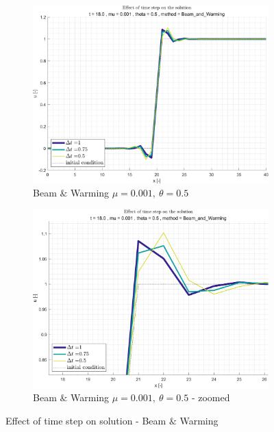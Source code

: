 \documentclass[11pt, a4paper]{article}
\begin{document}
\begin{figure}[H]
\begin{subfigure}[c]{.38\textwidth}
        \label{fig:Beam & Warming_general_mu0.25_theta0.5_B_diff_time}
    \end{subfigure}
    \begin{subfigure}[c]{.38\textwidth}
        \centering
        \includegraphics[width=\textwidth]{images/grap15.png}
        \caption{Beam $\&$ Warming $\mu=0.001,\ \theta=0.5$}
        \label{fig:Beam & Warming_general_mu0.001_theta0.5_A_diff_time}
    \end{subfigure}
    \begin{subfigure}[c]{.38\textwidth}
        \centering
        \includegraphics[width=\textwidth]{images/grap15.1.png}
        \caption{Beam $\&$ Warming $\mu=0.001,\ \theta=0.5$ - zoomed}
        \label{fig:Beam_&_Warming_general_mu0.001_theta0.5_B_diff_time}
    \end{subfigure}
    \caption{Effect of time step on solution - Beam $\&$ Warming}
        \label{fig:Beam_&_Warming_general_diff_time}
\end{figure}
\end{document}
